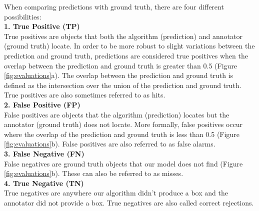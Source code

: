 \documentclass{article}
\begin{document}
When comparing predictions with ground truth, there are four different possibilities: \\

\textbf{1. \hspace{0.25cm} True Positive (TP)}\\
True positives are objects that both the algorithm (prediction) and annotator (ground truth) locate. In order to be more robust to slight variations between the prediction and ground truth, predictions are considered true positives when the overlap between the prediction and ground truth is greater than 0.5 (Figure \ref{fig:evaluations}a). The overlap between the prediction and ground truth is defined as the intersection over the union of the prediction and ground truth. True positives are also sometimes referred to as hits.\\

\textbf{2. \hspace{0.25cm} False Positive (FP)}\\
False positives are objects that the algorithm (prediction) locates but the annotator (ground truth) does not locate. More formally, false positives occur where the overlap of the prediction and ground truth is less than 0.5 (Figure \ref{fig:evaluations}b). False positives are also referred to as false alarms.\\

\textbf{3. \hspace{0.25cm} False Negative (FN)}\\
False negatives are ground truth objects that our model does not find (Figure \ref{fig:evaluations}b). These can also be referred to as misses.\\

\textbf{4. \hspace{0.25cm} True Negative (TN)}\\
True negatives are anywhere our algorithm didn’t produce a box and the annotator did not provide a box. True negatives are also called correct rejections.\\
\end{document}
